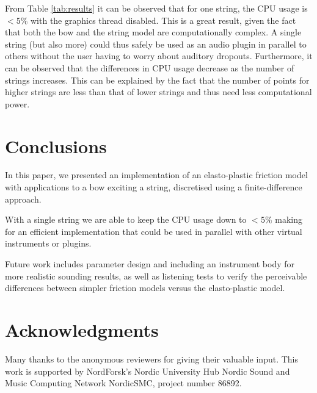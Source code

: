\documentclass[twoside,a4paper,dvipsnames]{article}
\begin{document}
From Table \ref{tab:results} it can be observed that for one string, the CPU usage is $<5\%$ with the graphics thread disabled. This is a great result, given the fact that both the bow and the string model are computationally complex. A single string (but also more) could thus safely be used as an audio plugin in parallel to others without the user having to worry about auditory dropouts. Furthermore, it can be observed that the differences in CPU usage decrease as the number of strings increases. This can be explained by the fact that the number of points for higher strings are less than that of lower strings and thus need less computational power.

\section{Conclusions}\label{sec:conclusion}
In this paper, we presented an implementation of an elasto-plastic friction model with applications to a  bow exciting a string, discretised using a finite-difference approach. 

With a single string we are able to keep the CPU usage down to $<5\%$ making for an efficient implementation that could be used in parallel with other virtual instruments or plugins.

Future work includes parameter design and including an instrument body for more realistic sounding results, as well as listening tests to verify the perceivable differences between simpler friction models versus the elasto-plastic model.



\section{Acknowledgments}
Many thanks to the anonymous reviewers for giving their valuable input. This work is supported by NordForsk's Nordic
University Hub Nordic Sound and Music Computing Network
NordicSMC, project number 86892.

\begin{footnotesize}

 
\end{footnotesize}

\end{document}
